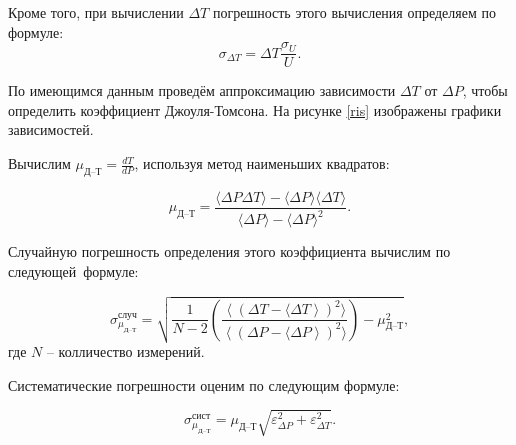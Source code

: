 \documentclass[a4paper,12pt]{article} %
\begin{document}
Кроме того, при вычислении $ \Delta T $ погрешность этого вычисления определяем по формуле: \[ \sigma_{\Delta T} = \Delta T \frac{\sigma_U}{U}. \]

По имеющимся данным проведём аппроксимацию зависимости $ \Delta T $ от $ \Delta P $, чтобы определить коэффициент Джоуля-Томсона. На рисунке \ref{ris} изображены графики зависимостей.



Вычислим $ \mu_\text{Д--Т} = \frac{dT}{dP} $, используя метод наименьших квадратов:

\[ \mu_\text{Д--Т} = \frac{\langle \Delta P \Delta T \rangle - \langle \Delta P \rangle \langle \Delta T \rangle}{\langle \Delta P \rangle - \langle \Delta P \rangle ^2}.\]

Случайную погрешность определения этого коэффициента вычислим по следующей~формуле:

\[ \sigma^\text{случ}_{\mu_\text{Д--Т}} = \sqrt{\frac{1}{N-2} \left(\frac{\left\langle\left(\Delta T - \langle \Delta T\right\rangle\right)^2 \rangle}{\left\langle\left(\Delta P - \langle \Delta P\right\rangle\right)^2 \rangle}\right)-\mu_\text{Д--Т}^2},\] где  $ N $  -- колличество измерений.



Систематические погрешности оценим по следующим формуле:

\[ \sigma^\text{сист}_{\mu_\text{Д--Т}} = {\mu_\text{Д--Т}}\sqrt{\varepsilon^2_{\Delta P}+\varepsilon^2_{\Delta T}}.\]
\end{document}
